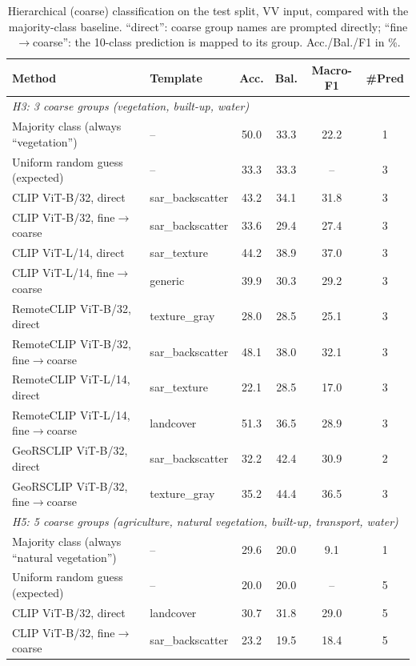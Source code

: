 \begin{table}[t]
\centering
\scriptsize
\caption{Hierarchical (coarse) classification on the test split, VV input, compared with the majority-class baseline. ``direct'': coarse group names are prompted directly; ``fine$\to$coarse'': the 10-class prediction is mapped to its group. Acc./Bal./F1 in \%.}
\label{tab:hier}
\begin{tabular*}{\hsize}{@{\extracolsep{\fill}}llcccc@{}}
\toprule
Method & Template & Acc. & Bal. & Macro-F1 & \#Pred \\
\midrule
\multicolumn{6}{l}{\textit{H3: 3 coarse groups (vegetation, built-up, water)}} \\
Majority class (always ``vegetation'') & -- & 50.0 & 33.3 & 22.2 & 1 \\
Uniform random guess (expected) & -- & 33.3 & 33.3 & -- & 3 \\
CLIP ViT-B/32, direct & sar\_backscatter & 43.2 & 34.1 & 31.8 & 3 \\
CLIP ViT-B/32, fine$\to$coarse & sar\_backscatter & 33.6 & 29.4 & 27.4 & 3 \\
CLIP ViT-L/14, direct & sar\_texture & 44.2 & 38.9 & 37.0 & 3 \\
CLIP ViT-L/14, fine$\to$coarse & generic & 39.9 & 30.3 & 29.2 & 3 \\
RemoteCLIP ViT-B/32, direct & texture\_gray & 28.0 & 28.5 & 25.1 & 3 \\
RemoteCLIP ViT-B/32, fine$\to$coarse & sar\_backscatter & 48.1 & 38.0 & 32.1 & 3 \\
RemoteCLIP ViT-L/14, direct & sar\_texture & 22.1 & 28.5 & 17.0 & 3 \\
RemoteCLIP ViT-L/14, fine$\to$coarse & landcover & 51.3 & 36.5 & 28.9 & 3 \\
GeoRSCLIP ViT-B/32, direct & sar\_backscatter & 32.2 & 42.4 & 30.9 & 2 \\
GeoRSCLIP ViT-B/32, fine$\to$coarse & texture\_gray & 35.2 & 44.4 & 36.5 & 3 \\
\midrule
\multicolumn{6}{l}{\textit{H5: 5 coarse groups (agriculture, natural vegetation, built-up, transport, water)}} \\
Majority class (always ``natural vegetation'') & -- & 29.6 & 20.0 & 9.1 & 1 \\
Uniform random guess (expected) & -- & 20.0 & 20.0 & -- & 5 \\
CLIP ViT-B/32, direct & landcover & 30.7 & 31.8 & 29.0 & 5 \\
CLIP ViT-B/32, fine$\to$coarse & sar\_backscatter & 23.2 & 19.5 & 18.4 & 5 \\

\end{tabular*}
\end{table}
